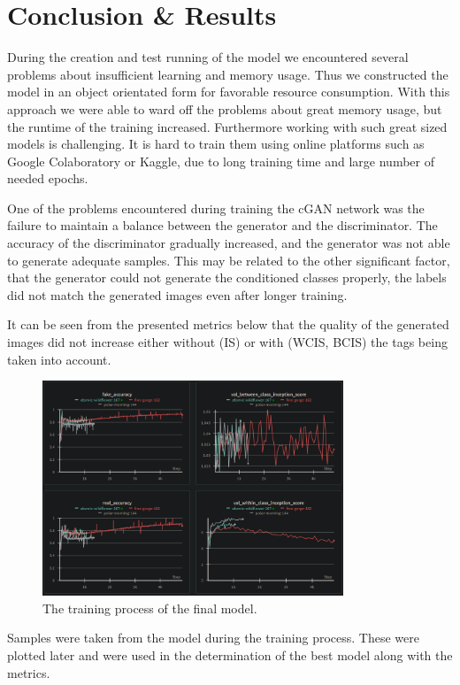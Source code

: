 \documentclass[lettersize,journal]{IEEEtran}
\begin{document}
\section{Conclusion \& Results}
During the creation and test running of the model we encountered several problems about insufficient learning and memory usage. Thus we constructed the model in an object orientated form for favorable resource consumption. With this approach we were able to ward off the problems about great memory usage, but the runtime of the training increased.
Furthermore working with such great sized models is challenging. It is hard to train them using online platforms such as Google Colaboratory or Kaggle, due to long training time and large number of needed epochs.

One of the problems encountered during training the cGAN network was the failure to maintain a balance between the generator and the discriminator. The accuracy of the discriminator gradually increased, and the generator was not able to generate adequate samples. This may be related to the other significant factor, that the generator could not generate the conditioned classes properly, the labels did not match the generated images even after longer training.

It can be seen from the presented metrics below that the quality of the generated images did not increase either without (IS) or with (WCIS, BCIS) the tags being taken into account.

\begin{figure}[h]
    \centering
    \includegraphics[width=9cm]{Untitled.png}
    \caption{The training process of the final model.}
\end{figure}

Samples were taken from the model during the training process. These were plotted later and were used in the determination of the best model along with the metrics.
\newpage
\end{document}
